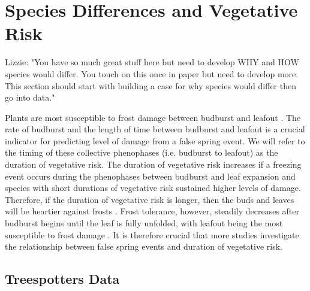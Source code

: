 \documentclass{article}\usepackage[]{graphicx}\usepackage[]{color}
\begin{document}
\section*{Species Differences and Vegetative Risk}
Lizzie: "You have so much great stuff here but need to develop WHY and HOW species would differ. You touch on this once in paper but need to develop more. This section should start with building a case for why species would differ then go into data."

Plants are most susceptible to frost damage between budburst and leafout \citep{Lenz2016, Vitasse2014, Augspurger2009}. The rate of budburst and the length of time between budburst and leafout is a crucial indicator for predicting level of damage from a false spring event. We will refer to the timing of these collective phenophases (i.e. budburst to leafout) as the duration of vegetative risk. The duration of vegetative risk increases if a freezing event occurs during the phenophases between budburst and leaf expansion and species with short durations of vegetative risk sustained higher levels of damage. Therefore, if the duration of vegetative risk is longer, then the buds and leaves will be heartier against frosts \citep{Augspurger2009}. Frost tolerance, however, steadily decreases after budburst begins until the leaf is fully unfolded, with leafout being the most susceptible to frost damage \citep{Lenz2016}. It is therefore crucial that more studies investigate the relationship between false spring events and duration of vegetative risk. 

\subsection*{Treespotters Data}
\end{document}

